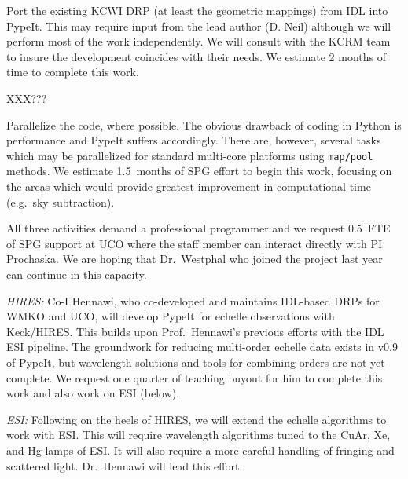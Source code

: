 \documentclass[12pt,preprint]{aastex}
\newenvironment{my_enumerate}{
\begin{enumerate}
  \setlength{\itemsep}{1pt}
  \setlength{\parskip}{0pt}
  \setlength{\parsep}{0pt}}{\end{enumerate}
}
\begin{document}
\begin{my_enumerate}

\vskip -0.15in

\item  Port the existing KCWI DRP (at least the geometric
mappings) from IDL into PypeIt.  This may require 
input from the lead author (D. Neil) although we will 
perform most of the work independently.
We will consult with the KCRM team to insure the development
coincides with their needs.  We estimate 2 months of 
time to complete this work.

\item XXX???

\item Parallelize the code, where possible.  The obvious drawback
of coding in Python is performance and PypeIt suffers accordingly.
There are, however, several tasks which may be parallelized
for standard multi-core platforms using {\tt map/pool} methods.
We estimate 1.5~months of SPG effort to begin this work, 
focusing on the areas which would provide greatest 
improvement in computational time (e.g.\ sky subtraction). 
\end{my_enumerate}

\vskip -0.15in

\noindent
All three activities demand a professional programmer
and we request 0.5~FTE of SPG support at UCO where
the staff member can interact directly with PI Prochaska.
We are hoping that Dr.\ Westphal who joined the project
last year can continue in this capacity.

\noindent 
{\it HIRES:} 
Co-I Hennawi, who co-developed and maintains 
IDL-based DRPs for WMKO and UCO, will develop PypeIt 
for echelle observations with Keck/HIRES.
This builds upon Prof.\ Hennawi's previous efforts
with the IDL ESI pipeline. The groundwork for reducing
multi-order echelle data exists in v0.9 of PypeIt, but
wavelength solutions and tools for combining orders are not 
yet complete. 
We request one quarter of teaching buyout for 
him to complete this work and also work on ESI (below). 


\vskip 0.05in

\noindent 
{\it ESI:} 
Following on the heels of HIRES, we will extend the
echelle algorithms to work with ESI.  This will require
wavelength algorithms tuned to the CuAr, Xe, and Hg 
lamps of ESI.  It will also require a more careful
handling of fringing and scattered light.
Dr.\ Hennawi will lead this effort.
\end{document}

